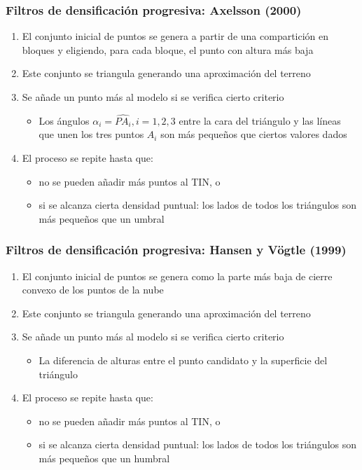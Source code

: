 \begin{frame}
  \frametitle{Filtros de densificación progresiva: Axelsson (2000)}
  \begin{enumerate}
    \item El conjunto inicial de puntos se genera a partir de una compartición
      en bloques y eligiendo, para cada bloque, el punto con altura más baja
    \item Este conjunto se triangula generando una aproximación del terreno
    \item Se añade un punto más al modelo si se verifica cierto criterio
      \begin{itemize}
        \item Los ángulos $\alpha_i = \widehat{PA_i}, i=1,2,3$ entre la cara del
          triángulo y las líneas que unen los tres puntos $A_i$ son más pequeños
          que ciertos valores dados
      \end{itemize}
    \item El proceso se repite hasta que:
      \begin{itemize}
        \item no se pueden añadir más puntos al TIN, o
        \item si se alcanza cierta densidad puntual: los lados de todos los
          triángulos son más pequeños que un umbral
      \end{itemize}
  \end{enumerate}
\end{frame}
\begin{frame}
  \frametitle{Filtros de densificación progresiva: Hansen y Vögtle (1999)}
  \begin{enumerate}
    \item El conjunto inicial de puntos se genera como la parte más baja de
      cierre convexo de los puntos de la nube
    \item Este conjunto se triangula generando una aproximación del terreno
    \item Se añade un punto más al modelo si se verifica cierto criterio
      \begin{itemize}
        \item La diferencia de alturas entre el punto candidato y la superficie
          del triángulo
      \end{itemize}
    \item El proceso se repite hasta que:
      \begin{itemize}
        \item no se pueden añadir más puntos al TIN, o
        \item si se alcanza cierta densidad puntual: los lados de todos los
          triángulos son más pequeños que un humbral
      \end{itemize}
  \end{enumerate}
\end{frame}

